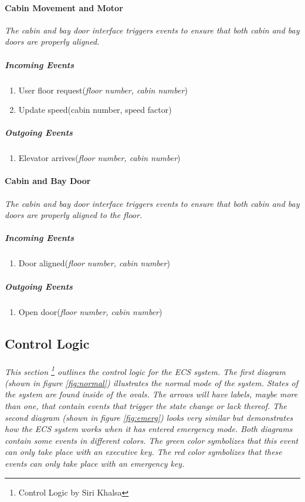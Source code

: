 \documentclass[12pt]{article}
\begin{document}
			\paragraph{Cabin Movement and Motor}
			\textit{The cabin and bay door interface triggers events to ensure
			that both cabin and bay doors are properly aligned.}
				\subparagraph{Incoming Events}
					\begin{enumerate}
						\item User floor request(\textit{floor number, cabin number})
						\item Update speed(cabin number, speed factor)
					\end{enumerate}
				\subparagraph{Outgoing Events}
					\begin{enumerate}
						\item Elevator arrives(\textit{floor number, cabin number})
					\end{enumerate}
					
			\paragraph{Cabin and Bay Door}	
			\textit{The cabin and bay door interface triggers events to ensure that 
			both cabin and bay doors are properly aligned to the floor.}		
				\subparagraph{Incoming Events}
					\begin{enumerate}
						\item Door aligned(\textit{floor number, cabin number})
					\end{enumerate}
				\subparagraph{Outgoing Events}
					\begin{enumerate}
						\item Open door(\textit{floor number, cabin number})
					\end{enumerate}
		
		\subsection{Control Logic} \label{logic}%
		\paragraph{} \textit{This section \footnote{Control Logic by Siri Khalsa} outlines the control logic for the ECS system. 
		The first diagram (shown in figure \ref{fig:normal}) illustrates the normal mode 
		of the system. States of the system are found inside of the ovals. 
		The arrows will have labels, maybe more than one, that contain events that trigger 
		the state change or lack thereof. The second diagram (shown in figure \ref{fig:emerg})
		looks very similar but demonstrates how the ECS system works when it has entered emergency mode. 
		Both diagrams contain some events in different colors. The green color symbolizes 
		that this event can only take place with an executive key. The red color symbolizes 
		that these events can only take place with an emergency key.}
\end{document}
